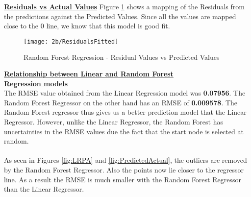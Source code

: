 \documentclass[letterpaper,twocolumn,10pt]{article}
\begin{document}
\textbf{\underline{Residuals vs Actual Values}}
Figure \ref{fig:ResidualsActuals} shows a mapping of the Residuals from the predictions against the Predicted Values. Since all the values are mapped close to the 0 line, we know that this model is good fit. 
\begin{figure}[H]
  \texttt{[image: 2b/ResidualsFitted]}
  \caption{Random Forest Regression - Residual Values vs Predicted Values}
  \label{fig:ResidualsActuals}
\end{figure}
\textbf{\underline{Relationship between Linear and Random Forest}}\\\textbf{\underline{ Regression models}}\\
The RMSE value obtained from the Linear Regression model was \textbf{0.07956}. The Random Forest Regressor on the other hand has an RMSE of \textbf{0.009578}. The Random Forest regressor thus gives us a better prediction model that the Linear Regressor. However, unlike the Linear Regressor, the Random Forest has uncertainties in the RMSE values due the fact that the start node is selected at random.\\
 \\
 As seen in Figures \ref{fig:LRPA} and \ref{fig:PredictedActual}, the outliers are removed by the Random Forest Regressor. Also the points now lie closer to the regressor line. As a result the RMSE is much smaller with the Random Forest Regressor than the Linear Regressor.
\end{document}
